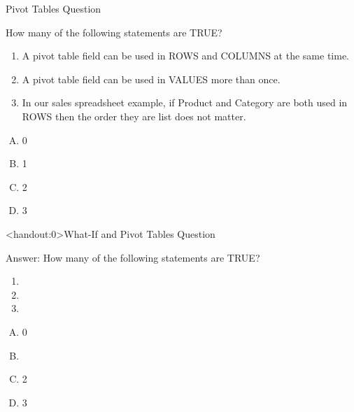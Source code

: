 \documentclass[xcolor=svgnames]{beamer}
\begin{document}
\begin{frame}{Pivot Tables Question}
  \begin{example}
 How many of the following statements are TRUE?
 \begin{enumerate}
\item A pivot table field can be used in ROWS and COLUMNS at the same time.
\item A pivot table field can be used in VALUES more than once.
\item In our sales spreadsheet example, if Product and Category are both used in ROWS then the order they are list does not matter.
 \end{enumerate}
\begin{multicols}{5}
\begin{enumerate}[A)]
\item 0 
\item 1
\item 2
\item 3
\end{enumerate}
\end{multicols}
  \end{example} 
\end{frame}

\begin{frame}<handout:0>{What-If and Pivot Tables Question}
  \begin{block}{Answer:}
 How many of the following statements are TRUE?
 \begin{enumerate}
\item {}
\item {}
\item {}
 \end{enumerate}
\begin{multicols}{5}
\begin{enumerate}[A)]
\item 0 
\item \textbf<4>{\textit<4>{{}}}
\item 2
\item 3
\end{enumerate}
\end{multicols}
  \end{block} 
\end{frame}
\end{document}
